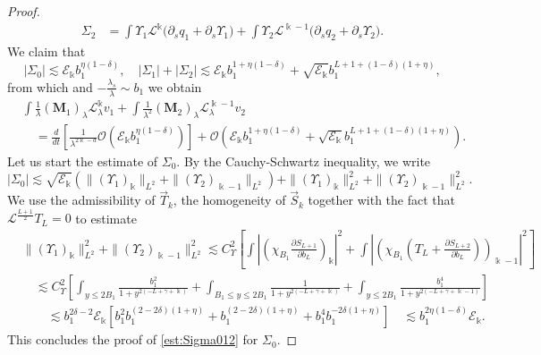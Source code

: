 \documentclass[11pt]{aims}
\theoremstyle{definition}
\numberwithin{equation}{section}
\begin{document}
\begin{proof}
\begin{align*}
\Sigma_2 & =\int \Upsilon_1 {\mathscr{L}}^\Bbbk \big({\partial_s} q_1 + {\partial_s} \Upsilon_1 \big) + \int \Upsilon_2 {\mathscr{L}}^{\Bbbk-1} \big({\partial_s} q_2 + {\partial_s} \Upsilon_2\big).
\end{align*}
We claim that 
\begin{equation}\label{est:Sigma012}
|\Sigma_0| \lesssim {\mathscr{E}}_\Bbbk b_1^{\eta(1 - \delta)}, \quad |\Sigma_1| + |\Sigma_2| \lesssim {\mathscr{E}}_\Bbbk b_1^{1 + \eta(1 - \delta)} + \sqrt{{\mathscr{E}}_\Bbbk}b_1^{L + 1 + (1 - \delta)(1 + \eta)},
\end{equation}
from which and $-\frac{\lambda_s}{\lambda} \sim b_1$ we obtain 
\begin{align}
&\int \frac{1}{\lambda}(\mathbf{M}_1)_\lambda {\mathscr{L}}^\Bbbk_\lambda v_1 + \int \frac{1}{\lambda^2}(\mathbf{M}_2)_\lambda {\mathscr{L}}^{\Bbbk-1}_\lambda v_2 \nonumber \\
&\quad =  \frac{d}{dt} \left[\frac{1}{\lambda^{2\Bbbk - d}}{\mathcal{O}}\left({\mathscr{E}}_\Bbbk b_1^{\eta(1 - \delta)}\right) \right] + {\mathcal{O}}\left({\mathscr{E}}_\Bbbk b_1^{1 + \eta(1 - \delta)} + \sqrt{{\mathscr{E}}_\Bbbk}b_1^{L + 1 + (1 - \delta)(1 + \eta)}\right). \label{est:Modk}
\end{align}
Let us start the estimate of $\Sigma_0$. By the Cauchy-Schwartz inequality, we write
\begin{equation*}
|\Sigma_0|\lesssim \sqrt{{\mathscr{E}}_\Bbbk} \left(\|(\Upsilon_1)_{\Bbbk}\|_{L^2} + \|(\Upsilon_2)_{\Bbbk - 1}\|_{L^2}\right) + \|(\Upsilon_1)_{\Bbbk}\|^2_{L^2} + \|(\Upsilon_2)_{\Bbbk - 1}\|^2_{L^2}.
\end{equation*}
We use the admissibility of $\vec T_k$, the homogeneity of $\vec{S}_{k}$ together with the fact that ${\mathscr{L}}^\frac{L+1}{2}T_L = 0$ to estimate 
\begin{align}
&\|(\Upsilon_1)_{\Bbbk}\|^2_{L^2} + \|(\Upsilon_2)_{\Bbbk - 1}\|^2_{L^2} \lesssim C_\Upsilon^2\left[\int \left|\left(\chi_{B_1} \frac{\partial S_{L+1}}{\partial b_L}\right)_{\Bbbk}\right|^2 +  \int \left|\left(\chi_{B_1} \left( T_L +  \frac{\partial S_{L+2}}{\partial b_L}\right)\right)_{\Bbbk - 1}\right|^2\right]\nonumber\\
&\quad \lesssim C_\Upsilon^2 \left[\int_{y \leq 2B_1}\frac{b_1^2}{1 + y^{2(- L + \gamma + \Bbbk)}} + \int_{B_1 \leq y \leq 2B_1}\frac{1}{1 + y^{2(- L + \gamma  + \Bbbk)}}  +\int_{y \leq 2B_1}\frac{b_1^4}{1 + y^{2(-L + \gamma + \Bbbk - 1)}} \right]\nonumber\\
& \qquad \lesssim b_1^{2\delta - 2}{\mathscr{E}}_\Bbbk \left[b_1^2 b_1^{(2 - 2\delta)(1 + \eta)} + b_1^{(2 - 2\delta)(1 + \eta)} + b_1^4b_1^{-2\delta(1 + \eta)}\right] \quad \lesssim b_1^{2\eta(1 - \delta)}{\mathscr{E}}_\Bbbk.\label{est:Up12}
\end{align} 
This concludes the proof of \eqref{est:Sigma012} for $\Sigma_0$.


\end{proof}
\end{document}
